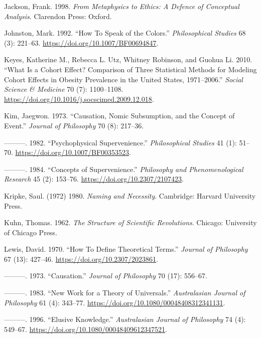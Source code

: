 \documentclass[
  12pt,
  letterpaper,
  DIV=11,
  numbers=noendperiod]{scrartcl}
\newlength{\cslhangindent}
\newenvironment{CSLReferences}[2] %
 {\begin{list}{}{%
  \setlength{\itemindent}{0pt}
  \setlength{\leftmargin}{0pt}
  \setlength{\parsep}{0pt}
  \ifodd #1
   \setlength{\leftmargin}{\cslhangindent}
   \setlength{\itemindent}{-1\cslhangindent}
  \fi
  \setlength{\itemsep}{#2\baselineskip}}}
 {\end{list}}
\begin{document}
\begin{CSLReferences}{1}{0}
Jackson, Frank. 1998. \emph{From Metaphysics to Ethics: A Defence of
Conceptual Analysis}. Clarendon Press: Oxford.

Johnston, Mark. 1992. {``How To Speak of the Colors.''}
\emph{Philosophical Studies} 68 (3): 221--63.
\url{https://doi.org/10.1007/BF00694847}.

Keyes, Katherine M., Rebecca L. Utz, Whitney Robinson, and Guohua Li.
2010. {``What Is a Cohort Effect? Comparison of Three Statistical
Methods for Modeling Cohort Effects in Obesity Prevalence in the United
States, 1971--2006.''} \emph{Social Science \& Medicine} 70 (7):
1100--1108. \url{https://doi.org/10.1016/j.socscimed.2009.12.018}.

Kim, Jaegwon. 1973. {``Causation, Nomic Subsumption, and the Concept of
Event.''} \emph{Journal of Philosophy} 70 (8): 217--36.

---------. 1982. {``Psychophysical Supervenience.''} \emph{Philosophical
Studies} 41 (1): 51--70. \url{https://doi.org/10.1007/BF00353523}.

---------. 1984. {``Concepts of Supervenience.''} \emph{Philosophy and
Phenomenological Research} 45 (2): 153--76.
\url{https://doi.org/10.2307/2107423}.

Kripke, Saul. (1972) 1980. \emph{Naming and Necessity}. Cambridge:
Harvard University Press.

Kuhn, Thomas. 1962. \emph{The Structure of Scientific Revolutions}.
Chicago: University of Chicago Press.

Lewis, David. 1970. {``How To Define Theoretical Terms.''} \emph{Journal
of Philosophy} 67 (13): 427--46. \url{https://doi.org/10.2307/2023861}.

---------. 1973. {``Causation.''} \emph{Journal of Philosophy} 70 (17):
556--67.

---------. 1983. {``New Work for a Theory of Universals.''}
\emph{Australasian Journal of Philosophy} 61 (4): 343--77.
\url{https://doi.org/10.1080/00048408312341131}.

---------. 1996. {``Elusive Knowledge.''} \emph{Australasian Journal of
Philosophy} 74 (4): 549--67.
\url{https://doi.org/10.1080/00048409612347521}.


\end{CSLReferences}
\end{document}
